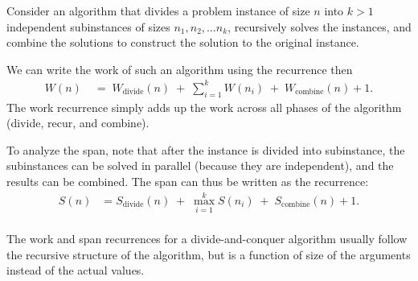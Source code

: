 \begin{cluster}
\label{grp:grm:design::dc::analysis-of-divide-and-conquer-algorithms}

\begin{gram}
\label{grm:design::dc::analysis-of-divide-and-conquer-algorithms}
Consider an algorithm that divides a problem instance of size $n$ into
$k > 1$ independent subinstances of sizes $n_1, n_2, \ldots n_k$,
recursively solves the instances, and combine the solutions to
construct the solution to the original instance.

We can write the work of such an algorithm using the recurrence then
\[ \begin{align*}
  W(n) \;&=\; W_{\textrm{divide}}(n) \;+\; \sum_{i=1}^k W(n_i) \;+\; W_{\textrm{combine}}(n) + 1.
\end{align*} \]
The work recurrence simply adds up the work across all phases of the
algorithm (divide, recur, and combine).

To analyze the span, note that after the instance is divided into
subinstance, the subinstances can be solved in parallel (because they
are independent), and the results can be combined.  The span can thus
be written as the recurrence:
\[ \begin{align*}
S(n) &= S_{\textrm{divide}}(n) \;+\; \max_{i=1}^k S(n_i) \;+\; S_{\textrm{combine}}(n) + 1.\\
\end{align*} \]

\end{gram}
\end{cluster}

\begin{cluster}
\label{grp:nt:design::dc::work}

\begin{note}
\label{nt:design::dc::work}
The work and span recurrences for a divide-and-conquer algorithm
usually follow the recursive structure of the algorithm, but is a
function of size of the arguments instead of the actual values.

\end{note}
\end{cluster}


